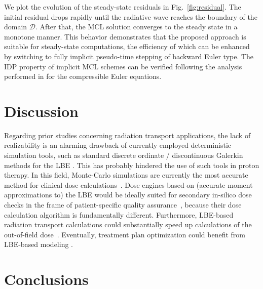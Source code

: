 \documentclass[preprint, 11pt]{elsarticle}
\begin{document}
We plot the evolution of the steady-state residuals in Fig.~\ref{fig:residual}.
The initial residual drops rapidly until the radiative wave reaches the boundary of the domain $\mathcal D$.  After that, the MCL solution converges to the steady state in a monotone manner. This behavior demonstrates that the proposed approach is suitable for steady-state computations, the efficiency of which can be enhanced by switching to fully implicit pseudo-time stepping of backward Euler type. The IDP property of implicit MCL schemes can be verified following the analysis performed in \cite{moujaes2025} for the compressible Euler equations.

\section{Discussion}
\label{sec:disc}

Regarding prior studies concerning radiation transport applications, the lack of realizability is an alarming drawback of currently employed deterministic simulation tools, such as standard discrete ordinate / discontinuous Galerkin methods for the LBE \cite{bedford2019,DeMartino2021dose,gifford2006,vassiliev2010}. This has probably hindered the use of such tools in proton therapy. In this field, Monte-Carlo simulations are currently the most accurate method for clinical dose calculations~\cite{JANSON2024,Lin2021,Saini2018,verbeek2021}. Dose engines based on (accurate moment approximations to) the LBE would be ideally suited for secondary in-silico dose checks in the frame of patient-specific quality assurance~\cite{Aitkenhead2020,Magro2022,Dreindl2024}, because their dose calculation algorithm is fundamentally different. Furthermore, LBE-based radiation transport calculations could substantially speed up calculations of the out-of-field dose~\cite{validation}. Eventually, treatment plan optimization could benefit from LBE-based modeling \citep{barnard2012,boman2007radiotherapy}.


\section{Conclusions}
\label{sec:concl}
\end{document}
